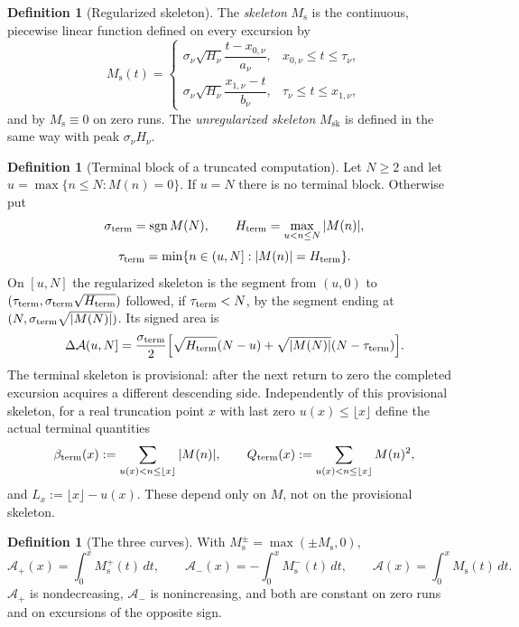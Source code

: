 \documentclass[11pt]{amsart}
\numberwithin{equation}{section}
\theoremstyle{plain}
\theoremstyle{definition}
\newtheorem{definition}[theorem]{Definition}
\theoremstyle{remark}
\DeclareMathOperator{\sgn}{sgn}
\newcommand{\Ms}{M_{\mathrm{s}}}
\newcommand{\Msk}{M_{\mathrm{sk}}}
\newcommand{\Ap}{\mathcal{A}_{+}}
\newcommand{\Am}{\mathcal{A}_{-}}
\newcommand{\Anet}{\mathcal{A}}
\begin{document}
\begin{definition}[Regularized skeleton]
\label{def:Ms}
The \emph{skeleton} $\Ms$ is the continuous, piecewise linear function
defined on every excursion by
\begin{equation}
\label{eq:Ms_def}
\Ms(t)=
\begin{cases}
\sigma_\nu\sqrt{H_\nu}\dfrac{t-x_{0,\nu}}{a_\nu},
 &x_{0,\nu}\le t\le\tau_\nu,\\[2ex]
\sigma_\nu\sqrt{H_\nu}\dfrac{x_{1,\nu}-t}{b_\nu},
 &\tau_\nu\le t\le x_{1,\nu},
\end{cases}
\end{equation}
and by $\Ms\equiv0$ on zero runs.  The \emph{unregularized skeleton} $\Msk$
is defined in the same way with peak $\sigma_\nu H_\nu$.
\end{definition}

\begin{definition}[Terminal block of a truncated computation]
\label{def:Ms-terminal}
Let $N\ge2$ and let $u=\max\{n\le N:M(n)=0\}$.  If $u=N$ there is no
terminal block. Otherwise put
\[
\sigma_{\rm term}=\sgn M(N),\qquad
H_{\rm term}=\max_{u<n\le N}|M(n)|,
\]
\[
\tau_{\rm term}=\min\{n\in(u,N]:|M(n)|=H_{\rm term}\}.
\]
On $[u,N]$ the regularized skeleton is the segment from $(u,0)$ to
$(\tau_{\rm term},\sigma_{\rm term}\sqrt{H_{\rm term}})$ followed, if
$\tau_{\rm term}<N$, by the segment ending at
$(N,\sigma_{\rm term}\sqrt{|M(N)|})$. Its signed area is
\[
\Delta\Anet(u,N]=\frac{\sigma_{\rm term}}2
\Bigl[\sqrt{H_{\rm term}}(N-u)+
\sqrt{|M(N)|}(N-\tau_{\rm term})\Bigr].
\]
The terminal skeleton is provisional: after the next return to zero the
completed excursion acquires a different descending side.  Independently of
this provisional skeleton, for a real truncation point $x$ with last zero
$u(x)\le\lfloor x\rfloor$ define the actual terminal quantities
\[
\beta_{\rm term}(x):=\sum_{u(x)<n\le\lfloor x\rfloor}|M(n)|,\qquad
Q_{\rm term}(x):=\sum_{u(x)<n\le\lfloor x\rfloor}M(n)^2,
\]
and $L_x:=\lfloor x\rfloor-u(x)$.  These depend only on $M$, not on the
provisional skeleton.
\end{definition}

\begin{definition}[The three curves]
\label{def:areas}
With $\Ms^{\pm}=\max(\pm\Ms,0)$,
\begin{equation}
\label{eq:areas_def}
\Ap(x)=\int_0^x\Ms^+(t)\,dt,\qquad
\Am(x)=-\int_0^x\Ms^-(t)\,dt,\qquad
\Anet(x)=\int_0^x\Ms(t)\,dt.
\end{equation}
$\Ap$ is nondecreasing, $\Am$ is nonincreasing, and both are constant on
zero runs and on excursions of the opposite sign.
\end{definition}
\end{document}
